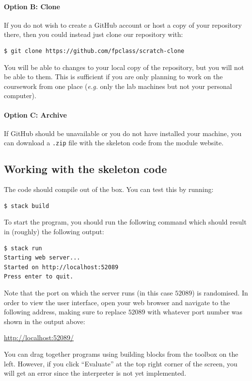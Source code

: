 \paragraph{Option B: Clone} If you do not wish to create a GitHub account or host a copy of your repository there, then you could instead just clone our repository with:
\begin{verbatim}
$ git clone https://github.com/fpclass/scratch-clone
\end{verbatim}
You will be able to  changes to your local copy of the repository, but you will not be able to  them. This is sufficient if you are only planning to work on the coursework from one place (\emph{e.g.} only the lab machines but not your personal computer).

\paragraph{Option C: Archive} If GitHub should be unavailable or you do not have  installed your machine, you can download a \texttt{\small .zip} file with the skeleton code from the module website.

\subsection{Working with the skeleton code}

The code should compile out of the box. You can test this by running:
\begin{verbatim}
$ stack build
\end{verbatim}
To start the program, you should run the following command which should result in (roughly) the following output:
\begin{verbatim}
$ stack run
Starting web server...
Started on http://localhost:52089
Press enter to quit.
\end{verbatim}
Note that the port on which the server runs (in this case $52089$) is randomised. In order to view the user interface, open your web browser and navigate to the following address, making sure to replace $52089$ with whatever port number was shown in the output above:
\begin{center}
\url{http://localhost:52089/}
\end{center}
You can drag together programs using building blocks from the toolbox on the left. However, if you click ``Evaluate'' at the top right corner of the screen, you will get an error since the interpreter is not yet implemented.

